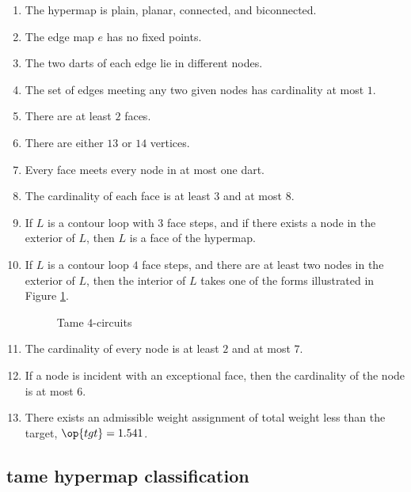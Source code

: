 \begin{enumerate}
    \label{definition:tame}
    \item The hypermap is plain, planar,  connected, and biconnected.
    \item The edge map $e$ has no fixed points.
    \item The two darts of each edge lie in different nodes.
    \item The set of edges meeting any two given nodes has cardinality at most $1$.
    \item There are at least $2$ faces.
    \item There are either $13$ or $14$ vertices.
    \item Every face meets every node in at most one
        dart.
    \label{definition:tame:40}
    \item The cardinality of each face is at least $3$ and at most $8$.
    \label{definition:tame:length}

    \item If $L$ is a contour loop with $3$ face steps, and if there exists a node in
    the exterior of $L$, then $L$ is a face of the hypermap.
    \label{definition:tame:3-circuit}

    \item If $L$ is a contour loop  $4$ face steps, and there are at least two nodes
    in the exterior of $L$, then the interior of $L$ takes one of the forms
    illustrated in Figure
    \ref{fig:fourcircuit}.
    \label{definition:tame:4-circuit}
    \begin{figure}[htb]
        \centering
        \caption{Tame $4$-circuits}
        \label{fig:fourcircuit}
    \end{figure}

    \item The cardinality of every node is at least $2$ and at most
    $7$.
    \label{definition:tame:degree}

    \item If a node is incident with an exceptional face,
        then the cardinality of the node is at most $6$.
    \label{definition:tame:degreeE}
    \item There exists an admissible weight assignment
        of total weight less than the target, $\op{tgt}=1.541$.
    \label{definition:tame:squander}
\end{enumerate}
%

\subsection{tame hypermap classification}
    \label{sec:proof-classification}

